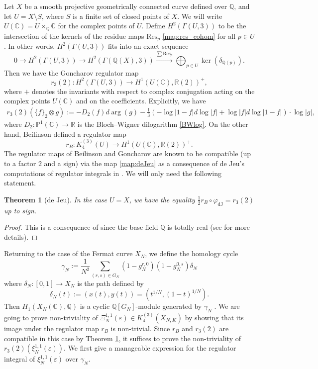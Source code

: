\documentclass[11pt,a4,leqno]{amsart}
\theoremstyle{my theoremstyle}
\newtheorem{thm}{Theorem}[section]
\theoremstyle{dfn}
\theoremstyle{remark}
\renewcommand{\1}{\mathbbm{1}}
\newcommand{\Q}{\mathbb{Q}}
\newcommand{\R}{\mathbb{R}}
\newcommand{\C}{\mathbb{C}}
\newcommand{\e}{\varepsilon}
\numberwithin{equation}{section}
\begin{document}
Let $X$ be a smooth projective geometrically connected curve defined over $\Q$, and let $U=X \setminus S$, where $S$ is a finite set of closed points of $X$. 
We will write $U(\C)=U \times_{\Q} \C$ for the complex points of $U$. Define $H^2(\Gamma(U,3))$ to be the intersection of the kernels of the residue maps $\mathrm{Res}_p$ \eqref{map:res_cohom} for all $p\in U$. In other words, $H^2(\Gamma(U,3))$ fits into an exact sequence
\[
0\longrightarrow H^2(\Gamma(U,3)) \longrightarrow H^2(\Gamma(\Q(X),3)) \overset{\sum \mathrm{Res}_p}{\longrightarrow} \bigoplus_{p\in U} \ker(\delta_{\Q(p)}).
\]
Then we have the Goncharov regulator map \cite[Theorem 2.2]{Goncharov2}
$$r_3(2) \colon H^2(\Gamma(U, 3)) \longrightarrow H^1(U(\C), \R(2))^{+}, $$
where $+$ denotes the invariants with respect to complex conjugation acting on the complex points $U(\C)$ and on the coefficients. 
Explicitly, we have 
\begin{align} \label{regulator} 
r_3(2) (\{f\}_2 \otimes g):= -D_2(f) d\arg(g) -\frac13 \left(-\log|1-f| d\log|f| + \log |f| d\log|1-f| \right) \cdot \log|g|, 
\end{align}
where $D_2 \colon \mathbb{P}^1(\C) \to \R$ is the Bloch--Wigner dilogarithm \eqref{BWlog}. On the other hand, Beilinson \cite{Bei80, Nek94} defined a regulator map 
\begin{equation}\label{BeiReg}
    r_B \colon K_4^{(3)}(U) \longrightarrow H^1(U(\C), \R(2))^{+}.
\end{equation}
The regulator maps of Beilinson and Goncharov are known to be compatible (up to a factor $2$ and a sign) via the map \eqref{map:deJeu} as a consequence of de Jeu's computations of regulator integrals in \cite{Jeu96,Jeu00}. We will only need the following statement.

\begin{thm}[de Jeu] \label{thm:reg_comp}
    In the case $U=X$, we have the equality $\frac 12 r_B \circ \varphi_{\mathrm{dJ}} = r_3(2)$ up to sign.
\end{thm}

\begin{proof}
    This is a consequence of \cite[Theorem 5.4]{Jeu00} since the base field $\Q$ is totally real (see \cite[Section 6.1]{Bru20} for more details). 
\end{proof}

Returning to the case of the Fermat curve $X_N$, we define the homology cycle
\begin{equation}\label{def:gammaN}
\gamma_N := \frac{1}{N^2} \sum_{(r,s) \in G_N} (1-g_N^{r,0})(1-g_N^{0,s}) \delta_N
\end{equation}
where $\delta_N : [0,1] \to X_N$ is the path defined by $$\delta_N(t) := (x(t), y(t)) = (t^{1/N}, (1-t)^{1/N}).$$ 
Then $H_1(X_N(\C), \Q)$ is a cyclic $\Q[G_N]$-module generated by $\gamma_N$ \cite[Proposition 4.9]{Ots11}. We are going to prove non-triviality of $\Xi_N^{1,1}(\varepsilon)\in K_4^{(3)}(X_{N, K})$ by showing that its image under the regulator map $r_B$ is non-trivial. 
Since $r_B$ and $r_3(2)$ are compatible in this case by Theorem \ref{thm:reg_comp}, it suffices to prove the non-triviality of $r_3(2)(\xi^{1,1}_N(\e))$. 
We first give a manageable expression for the regulator integral of $\xi_N^{1,1}(\varepsilon)$ over $\gamma_N$.
\end{document}
